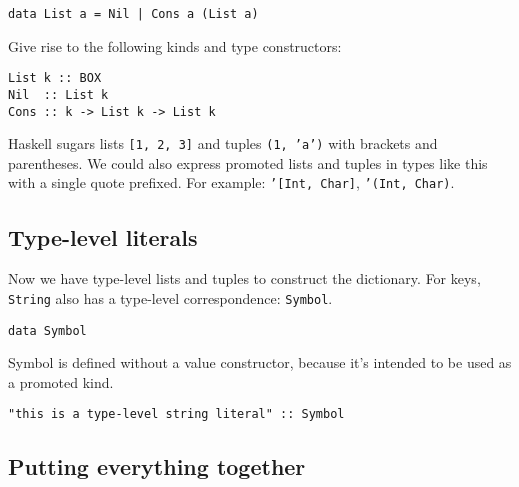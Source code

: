 \documentclass[pldi]{sigplanconf-pldi16}
\begin{document}
\begin{verbatim}
data List a = Nil | Cons a (List a)
\end{verbatim}

Give rise to the following kinds and type constructors:\footnotemark\footnotemark


\begin{verbatim}
List k :: BOX
Nil  :: List k
Cons :: k -> List k -> List k
\end{verbatim}

Haskell sugars lists \texttt{[1, 2, 3]} and tuples
 \texttt{(1, 'a')} with brackets and parentheses.
 We could also express promoted lists and tuples in types like this with
 a single quote prefixed. For example:
 \texttt{'}\texttt{[Int, Char]},
 \texttt{'}\texttt{(Int, Char)}.

\subsection{Type-level literals}

Now we have type-level lists and tuples to construct the dictionary.
For keys, \texttt{String} also has a type-level correspondence:
\texttt{Symbol}.

\begin{verbatim}
data Symbol
\end{verbatim}

Symbol is defined without a value constructor, because it's intended to be used
 as a promoted kind.

\begin{verbatim}
"this is a type-level string literal" :: Symbol
\end{verbatim}
%

\subsection{Putting everything together}
\end{document}
